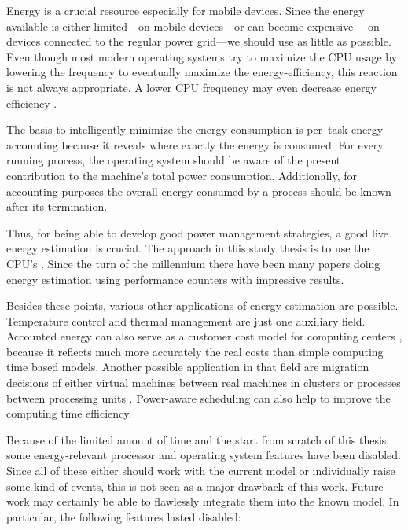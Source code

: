 
Energy is a crucial resource especially for mobile devices. Since the energy
available is either limited---on mobile devices---or can become expensive---
on devices connected to the regular power grid---we should use as little as
possible. Even though most modern operating systems try to maximize the CPU
usage by lowering the frequency \cite{snowdon2010operating} to eventually
maximize the energy-efficiency, this reaction is not always appropriate. A lower
CPU frequency may even decrease energy efficiency
\cite{weissel2002process,snowdon2010operating}.

The basis to intelligently minimize the energy consumption is per--task energy
accounting because it reveals where exactly the energy is consumed.
For every running process, the operating system should be aware of the present
contribution to the machine's total power consumption. Additionally, for
accounting purposes the overall energy consumed by a process should be known
after its termination.

Thus, for being able to develop good power management strategies, a good live
energy estimation is crucial. The approach in this study thesis is to use the
CPU's . Since the turn of the millennium
\cite{bellosa2000benefits} there have been many papers
\cite{Bertran2010,bertran2010decomposable,kellner03tempcontrol,isci2003runtime,
weissel2002process} doing energy estimation using performance counters with
impressive results.

Besides these points, various other applications of energy estimation are
possible. Temperature control \cite{kellner03tempcontrol} and thermal management
\cite{merkel05tmsmpsys} are just one auxiliary field. Accounted energy can also
serve as a customer cost model for computing centers \cite{Bertran2010}, because
it reflects much more accurately the real costs than simple computing time
based models. Another possible application in that field are migration decisions
of either virtual machines between real machines in clusters or processes
between processing units \cite{merkel10rcscheduling}. Power-aware scheduling can
also help to improve the computing time efficiency.


\label{sec:restrictions}

Because of the limited amount of time and the start from scratch of this thesis,
some energy-relevant processor and operating system features have been disabled.
Since all of these either should work with the current model or individually
raise some kind of events, this is not seen as a major drawback of this work.
Future work may certainly be able to flawlessly integrate them into the known
model. In particular, the following features lasted disabled:

